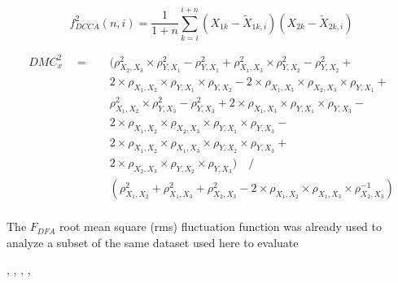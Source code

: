 \documentclass[10pt,letterpaper]{article}
\newcommand{\fdfa}{\(F_{DFA}\) }
\begin{document}
\begin{equation} \label{eq:fdcca}
  f_{DCCA}^{2}(n, i) = \frac{1}{1+n} \sum_{k=i}^{i + n} (X_{1k}-\widetilde{X}_{1k, i}) (X_{2k}-\widetilde{X}_{2k, i})
\end{equation}


\begin{equation}\label{eq:dmc_4x_y} 
  \begin{split}
DMC_{x}^{2} \quad = \quad & ( \rho^{2}_{X_{2},X_{3}} \times \rho^{2}_{Y,X_{1}}- \rho^{2}_{Y,X_{1}} + \rho^{2}_{X_{1},X_{3}}\times \rho^{2}_{Y,X_{2}}-\rho^{2}_{Y,X_{2}}+ \\
& 2 \times \rho_{X_{1},X_{2}} \times \rho_{Y,X_{1}} \times \rho_{Y,X_{2}}   - 2 \times \rho_{X_{1},X_{3}} \times \rho_{X_{2},X_{3}} \times \rho_{Y,X_{1}} + \\
& \rho^{2}_{X_{1},X_{2}} \times \rho^{2}_{Y,X_{3}}-\rho^{2}_{Y,X_{3}} + 2 \times \rho_{X_{1},X_{3}} \times \rho_{Y,X_{1}} \times \rho_{Y,X_{3}} - \\ 
& 2 \times \rho_{X_{1},X_{2}} \times \rho_{X_{2},X_{3}} \times \rho_{Y,X_{1}} \times \rho_{Y,X_{3}} - \\
& 2 \times \rho_{X_{1},X_{2}} \times \rho_{X_{1},X_{3}} \times \rho_{Y,X_{2}} \times \rho_{Y,X_{3}} + \\
& 2 \times \rho_{X_{2},X_{3}} \times \rho_{Y,X_{2}} \times \rho_{Y,X_{3}} ) \quad / \\
& ( \rho^{2}_{X_{1},X_{2}} + \rho^{2}_{X_{1},X_{3}} + \rho^{2}_{X_{2},X_{3}} - 2 \times \rho_{X_{1},X_{2}} \times \rho_{X_{1},X_{3}} \times \rho_{X_{2},X_{3}}^{-1}) \\
 \end{split}
\end{equation}




The \fdfa root mean square (rms) fluctuation function was already used to analyze a subset of the same dataset used here to evaluate   \cite{Mesquita2019} \cite{OliveiraFilho2019} \cite{OliveiraFilho2021}


\cite{Peng1994, Buldyrev1950}, \cite{Podobnik2008}, \cite{Zebende2011}, \cite{PhysRevE.84.066118}, 




\end{document}
